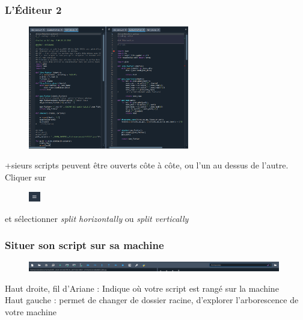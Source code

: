 \begin{frame} \frametitle{L'Éditeur 2}

  \begin{figure}
  \includegraphics[width=7cm]{images/spyder_editor2.png}
  \end{figure}
  
   +sieurs scripts peuvent être ouverts côte à côte, ou l'un au dessus de l'autre.\\
   Cliquer sur
  \vspace{-0.3cm} 
  \begin{figure}
  \includegraphics[width=0.5cm]{images/spyder_param.png}
  \end{figure} 
  \vspace{-0.3cm}
  et sélectionner \textit{split horizontally} ou \textit{split vertically}
\end{frame}


\begin{frame}
  \frametitle{Situer son script sur sa machine}
  \begin{figure}
  \includegraphics[width=11cm]{images/spyder_chemin.png}
  \end{figure}
   Haut droite, fil d'Ariane : Indique où votre script est rangé sur la machine\\
   Haut gauche : permet de changer de dossier racine, d'explorer l'arborescence de votre machine
\end{frame}

